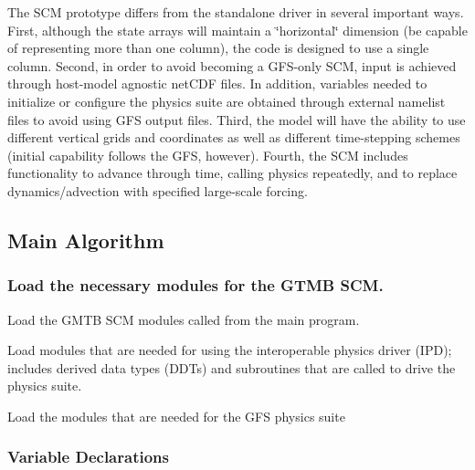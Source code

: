 The S\+CM prototype differs from the standalone driver in several important ways. First, although the state arrays will maintain a \char`\"{}horizontal\char`\"{} dimension (be capable of representing more than one column), the code is designed to use a single column. Second, in order to avoid becoming a G\+F\+S-\/only S\+CM, input is achieved through host-\/model agnostic net\+C\+DF files. In addition, variables needed to initialize or configure the physics suite are obtained through external namelist files to avoid using G\+FS output files. Third, the model will have the ability to use different vertical grids and coordinates as well as different time-\/stepping schemes (initial capability follows the G\+FS, however). Fourth, the S\+CM includes functionality to advance through time, calling physics repeatedly, and to replace dynamics/advection with specified large-\/scale forcing. \hypertarget{group___s_c_m_alg}{}\subsection{Main Algorithm}\label{group___s_c_m_alg}
\hypertarget{group___s_c_m_modules}{}\subsubsection{Load the necessary modules for the G\+T\+M\+B S\+C\+M.}\label{group___s_c_m_modules}

\begin{DoxyItemize}
\item Load the G\+M\+TB S\+CM modules called from the main program.
\item Load modules that are needed for using the interoperable physics driver (I\+PD); includes derived data types (D\+D\+Ts) and subroutines that are called to drive the physics suite.
\item Load the modules that are needed for the G\+FS physics suite
\end{DoxyItemize}\hypertarget{group___s_c_m_var_dec}{}\subsubsection{Variable Declarations}\label{group___s_c_m_var_dec}

